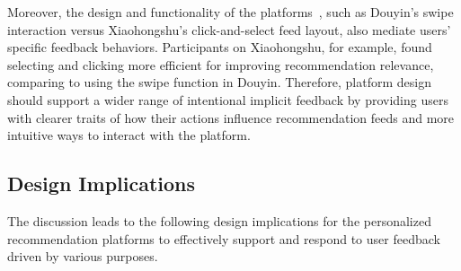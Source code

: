 Moreover, the design and functionality of the platforms~\cite{liu2010personalized}, such as Douyin’s swipe interaction versus Xiaohongshu’s click-and-select feed layout, also mediate users' specific feedback behaviors. Participants on Xiaohongshu, for example, found selecting and clicking more efficient for improving recommendation relevance, comparing to using the swipe function in Douyin. Therefore, platform design should support a wider range of intentional implicit feedback by providing users with clearer traits of how their actions influence recommendation feeds and more intuitive ways to interact with the platform.

\subsection{Design Implications}
The discussion leads to the following design implications for the personalized recommendation platforms to effectively support and respond to user feedback driven by various purposes.

